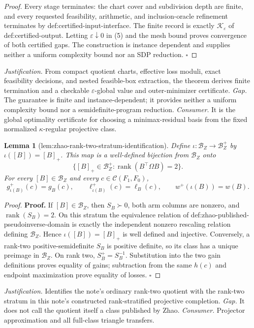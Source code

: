 \documentclass{article}
\newtheorem{lemma}{Lemma}
\begin{document}
\begin{proof}
Every stage terminates: the chart cover and subdivision depth are finite, and every requested feasibility, arithmetic, and inclusion-oracle refinement terminates by def:certified-input-interface.  The finite record is exactly \(\mathscr K_\varepsilon\) of def:certified-output.  Letting \(\varepsilon\downarrow0\) in (5) and the mesh bound proves convergence of both certified gaps.  The construction is instance dependent and supplies neither a uniform complexity bound nor an SDP reduction. \(\square\)
\end{proof}
\par\smallskip\noindent \textit{Justification.} From compact quotient charts, effective loss moduli, exact feasibility decisions, and nested feasible-box extraction, the theorem derives finite termination and a checkable \(\varepsilon\)-global value and outer-minimizer certificate. \textit{Gap.} The guarantee is finite and instance-dependent; it provides neither a uniform complexity bound nor a semidefinite-program reduction. \textit{Consumer.} It is the global optimality certificate for choosing a minimax-residual basis from the fixed normalized \(\kappa\)-regular projective class.

\begin{lemma}[lem:zhao-rank-two-stratum-identification]\label{lem:zhao-rank-two-stratum-identification}
Define \(\iota:\mathcal B_Z\to\mathcal B_Z^+\) by \(\iota([B])=[B]_+\).  This map is a well-defined bijection from \(\mathcal B_Z\) onto
\[
 \{[B]_+\in\mathcal B_Z^+:\operatorname{rank}(B^{\top}\Omega B)=2\}.
\]
For every \([B]\in\mathcal B_Z\) and every \(c\in\mathcal C(F_1,F_0)\),
\[
 g_{\iota(B)}^+(c)=g_B(c),
 \qquad \ell_{\iota(B)}^+(c)=\ell_B(c),
 \qquad w^+(\iota(B))=w(B).
\]
\end{lemma}
\begin{proof}
\textbf{Proof.}
If \([B]\in\mathcal B_Z\), then \(S_B\succ0\), both arm columns are nonzero, and \(\operatorname{rank}(S_B)=2\).  On this stratum the equivalence relation of def:zhao-published-pseudoinverse-domain is exactly the independent nonzero rescaling relation defining \(\mathcal B_Z\).  Hence \(\iota([B])=[B]_+\) is well defined and injective.  Conversely, a rank-two positive-semidefinite \(S_B\) is positive definite, so its class has a unique preimage in \(\mathcal B_Z\).  On rank two, \(S_B^+=S_B^{-1}\).  Substitution into the two gain definitions proves equality of gains; subtraction from the same \(h(c)\) and endpoint maximization prove equality of losses. \(\square\)
\end{proof}
\par\smallskip\noindent \textit{Justification.} Identifies the note's ordinary rank-two quotient with the rank-two stratum in this note's constructed rank-stratified projective completion. \textit{Gap.} It does not call the quotient itself a class published by Zhao. \textit{Consumer.} Projector approximation and all full-class triangle transfers.
\end{document}
